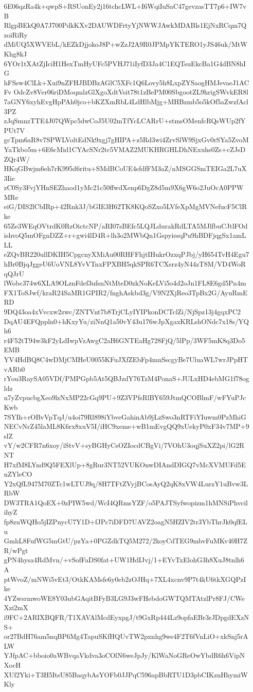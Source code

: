 6E06qzRa4k+qwpS+RSUonEy2j16tchcLWL+I6WqiIuSaC47gevzasTT7p6+IW7vB
RlgpBEkQ0A7J700PdkKXv2DAUWDFrtyYjNWWJAwkMDABls1EjNxRCqm7QzoiRiRy
dMiUQ5XWVEbL/kEZkDjjokoJ8P+wZzJ2A9R0JPMpYKTERO1yJS46uk/MtWKhg8kJ
6YOr1tXAtZjIciH1HexTmHyUFc5PVHJ71iIyfD3Ja4C1EQTsuEkcBa1G4dBN8hIG
hFSsw4ClLk+Xui9nZFHJBDBzAGlC5XFc1Q6Lovy5h8LxpZYSaogHMJevaeJ1ACFv
OdcZv8Ver06riDMoqmlzGlXgoXdtVsit78t1zBePM00SbgootZL9hrigSWvkER8l
7aGNY6xyhEvgHpPAh0jco+bKZXmRbL4LdHlbMjg+MHBzmb5o5kOf5aZwzfAcl3PZ
zJqSmnzTTE4J07QWpc5dwCoJ5U02mTfYcLCARrU+stmsOMenfcRQsWUp2fYPUt7V
gcTpm6aR8v7SPWLVoltEdNk9xgj7gHIPA+z5Rd3wi4ZrvSlW9SjxGv0rSYa5ZvoM
YaTkbo5m+6E6cMid1CYAcSNr2tc5VMAZ2MUKHRGHLDhNExuhs0Zs+cZJsDZQr4W/
HKqGBwjm6eh7rK995d6ritu+SMdBCoUE4sfdfFM3aZ/nMSGGSmTEIGa2L7uX3Iie
zC0Sy3FvjYHnSEZhaod1yMc21c50ffwdXenp6DgZ8d5m9X6gW6o2JuOcA0PPWMRe
eiG/DIS2lCbIRp+42Rnk3J/bGIE3H62TK8KQoSZxo5LVfeXpMgMVNefucF5ClRke
65Ze3WEqOVtrdK0RzOictcNP/aRI07sBEfc5LQJLdurakRdLTA5MJlfbuCJtlFOd
ishvoQ5mOFgnDZZ+r+gwi4lD4R+lh3o2MWbQn1GspyiesqPu9hBDFjqgSx1amLLL
eZQvBR220ullDKIH5CpgcnyXMiAu00RHFFhjtIHukrOzxqPJbj/yH654TvH4Egu7
hBr0BjqJggeU6UoVNL8YvVTnxFPXBH5qkSPR6TCXsrz4yN44zT8M/VD4WoRqQJrU
lWobc374w6XLA9OLznFdef3ufsnNtMteD0zkNoKeLVi5o4d2oJn1FL8E6gd5Pn4m
FX1ToSJwf/kraR24SaMR1GPIR2/fnghAskbd3g/V9N2XjReo3TpBx2G/AyuRmERD
9DQ43oa4xVvcxw2zwc/ZNTVnt7b8TrjCLyIYIPkonDCTclZi/NjSpz13j4gqxPC2
DqAU4EFQppln0+hKxyYu/ziNnQ1a50vY43u176wJpXgaxKRLshONdc7x18s/YQh6
r4F52tT94w3kF2yLdIwpVzAwgC2aH6GNTEaHg728FjQ/5lPp/3WF5mK8q3Do5EMB
YV4HdBQ8C4wDMjCMHeU0055KFuJXfZEbFp4mnSscgyBe7UluaWL7wrJPpHTvARb0
rYou3RaySA05VDf/PMPGpb5At5QBJzdY76TzM4PonaS+JULxHD4ebMG1f78ogldz
n7yZvpucbgXeo9lzNxMP22cGq9PU+9Z3VPfsRlBY659JtmQCOBlmF/wFYuPJcKwb
7SYIh+rOBvVpTqJ/u4oi79Rl898iYbveGahinAb9jLzSwo3nRTFiYIuwm0PzMhiG
NECvNrZ45laML8K6rx8xuV5I/iHC9xeme+wB1mEvgQQ9xUekyP0xF34v7MP+9slZ
vY/w2CFR7n6xoy/iStvV+syBGHyCsOZIocdCBgVi/7VOhU3oqjSuXZ2pi/lG2RNT
H7xfM8LYnd9Q5FEXlUp+8gRur3NT52VUKOnwDIAndDIGQ7vMcXVMUFd5EnZYleCO
Y2xQfL947M70ZTc1wLTUJ9q/8H7TFtZVyjBCosAyQ2qK8xVW4LurzY1uBvw3LRbW
DW3TRA1QoEX+0zPIW5wd/WcI4QRmsYZF/o5PAJTSyfwopizm1hMNSiPhvcilihyZ
fp8zuWQHo5jIZPnycU7Y1D+fJPc7iDFD7UAVZ2oagN5HZIV2tr3YbThrJk0qfELu
GmhL8FufWG5mGtU/pzYa+0PGZdkTQ5M272/2koyCdTEG9mbvFuMKv40H7ZR/wPgt
gPN4hysa4RdMvn/+vSofFaDS0fat+UW1HdIJvj/1+EYvTxElohG3h8XuJ8tnlh6A
ptWvoZ/mNWi5vEt3/OtkKAMsfe6y0eb2zOJHq+7XL4xcnv9P7t4kU6tkXGQPzIke
4YZwsrmwoWE8Y03ubGAqitBFyB3LG9J3wFHebdoGWTQMTAtzlPr8FJ/CWeXzi2mX
i9FC+2ARIXBQFR/T1XAVAlMcdEyxpgJ/t9GxRp444Lz9opfaEBr3rJDpgdEXzNS+
or27BdH76am5nqBP6Mg4TapuSKfHQUvTW2pxnhg9we4F2T6fVnLiO+xkSnj5rALW
YJfpAC+bboio0aWBvqaVkdva3oCOlN6weJpJy/KlWaNoGReOwYbdR6h6VipNXocH
XUf2Yki+T3H5ItsU85BaqybAsYOFb0JJPqC596apBbRTU1D3pbCIKznHhymiWKly
